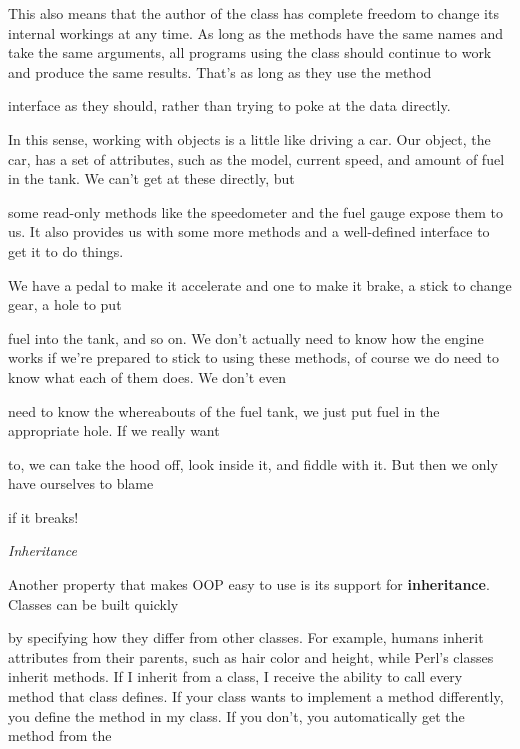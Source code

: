 \documentclass[a4paper,11pt]{book}
\begin{document}
\noindent 

\noindent This also means that the author of the class has complete freedom to change its internal workings at any time. As long as the methods have the same names and take the same arguments, all programs using the class should continue to work and produce the same results. That's as long as they use the method

\noindent interface as they should, rather than trying to poke at the data directly.

\noindent 

\noindent In this sense, working with objects is a little like driving a car. Our object, the car, has a set of attributes, such as the model, current speed, and amount of fuel in the tank. We can't get at these directly, but

\noindent some read-only methods like the speedometer and the fuel gauge expose them to us. It also provides us with some more methods and a well-defined interface to get it to do things.

\noindent 

\noindent We have a pedal to make it accelerate and one to make it brake, a stick to change gear, a hole to put

\noindent fuel into the tank, and so on. We don't actually need to know how the engine works if we're prepared to stick to using these methods, of course we do need to know what each of them does. We don't even

\noindent need to know the whereabouts of the fuel tank, we just put fuel in the appropriate hole. If we really want

\noindent to, we can take the hood off, look inside it, and fiddle with it. But then we only have ourselves to blame

\noindent if it breaks!

\noindent 

\noindent \textit{Inheritance}

\noindent Another property that makes OOP easy to use is its support for \textbf{inheritance}. Classes can be built quickly

\noindent by specifying how they differ from other classes. For example, humans inherit attributes from their parents, such as hair color and height, while Perl's classes inherit methods. If I inherit from a class, I receive the ability to call every method that class defines. If your class wants to implement a method differently, you define the method in my class. If you don't, you automatically get the method from the
\end{document}
